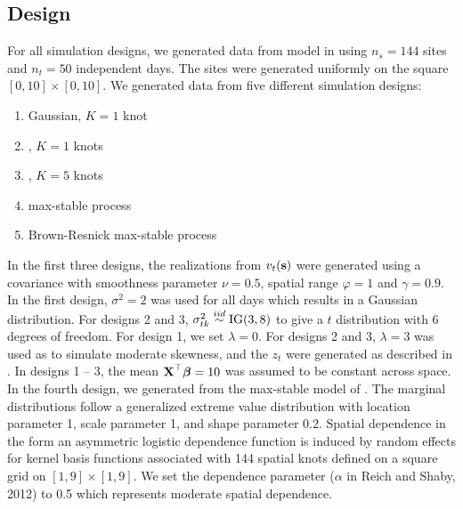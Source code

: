 \documentclass[useAMS,usenatbib,referee]{biom}
\begin{document}
\subsection{Design}\label{sts:simdesign}
For all simulation designs, we generated data from model  in  using $n_s=144$ sites and $n_t=50$ independent days.
The sites were generated uniformly on the square $[0, 10] \times [0, 10]$.
We generated data from five different simulation designs:
\begin{enumerate}[leftmargin=3em]
  \item Gaussian, $K=1$ knot
  \item \Skewt, $K=1$ knots
  \item \Skewt, $K=5$ knots
  \item \citet{Reich2012} max-stable process %
  \item Brown-Resnick max-stable process \citep{Kabluchko2009} %
\end{enumerate}
In the first three designs, the realizations from $v_t(\mbox{\bf s})$ were generated using a \Matern covariance with smoothness parameter $\nu = 0.5$, spatial range $\varphi = 1$ and $\gamma = 0.9$.
In the first design, $\sigma^2 = 2$ was used for all days which results in a Gaussian distribution.
For designs 2 and 3, $\sigma^2_{tk} \stackrel{iid}{\sim} \text{IG}(3, 8)$ to give a $t$ distribution with 6 degrees of freedom.
For design 1, we set $\lambda = 0$.
For designs 2 and 3, $\lambda = 3$ was used as to simulate moderate skewness, and the $z_t$ were generated as described in .
In designs 1 -- 3, the mean $\mbox{\bf X}^\top \mbox{\boldmath $\beta$} = 10$ was assumed to be constant across space.
In the fourth design, we generated from the max-stable model of \citet{Reich2012}.
The marginal distributions follow a generalized extreme value distribution with location parameter 1, scale parameter 1, and shape parameter 0.2.
Spatial dependence in the form an asymmetric logistic dependence function is induced by random effects for kernel basis functions associated with 144 spatial knots defined on a square grid on $[1,9] \times [1,9]$.
We set the dependence parameter ($\alpha$ in Reich and Shaby, 2012) to 0.5 which represents moderate spatial dependence.
\end{document}

